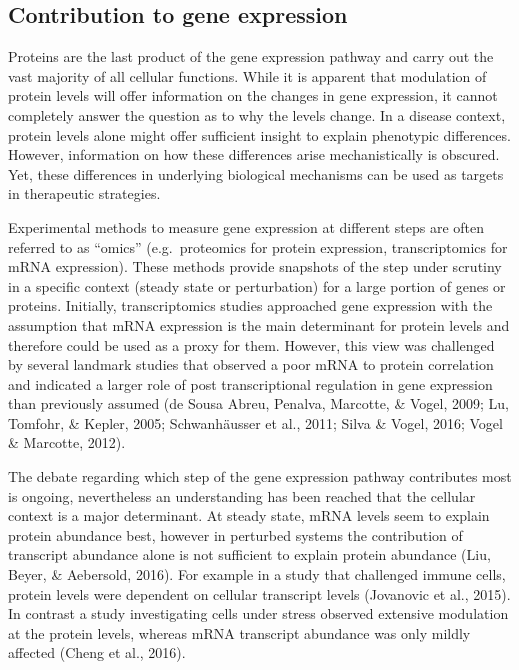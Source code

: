 \documentclass[
  12pt,
  openany]{book}
\begin{document}
\subsection{Contribution to gene expression}

Proteins are the last product of the gene expression pathway and carry out the vast majority of all cellular functions. While it is apparent that modulation of protein levels will offer information on the changes in gene expression, it cannot completely answer the question as to why the levels change. In a disease context, protein levels alone might offer sufficient insight to explain phenotypic differences. However, information on how these differences arise mechanistically is obscured. Yet, these differences in underlying biological mechanisms can be used as targets in therapeutic strategies.

Experimental methods to measure gene expression at different steps are often referred to as ``omics'' (e.g.~proteomics for protein expression, transcriptomics for mRNA expression). These methods provide snapshots of the step under scrutiny in a specific context (steady state or perturbation) for a large portion of genes or proteins. Initially, transcriptomics studies approached gene expression with the assumption that mRNA expression is the main determinant for protein levels and therefore could be used as a proxy for them. However, this view was challenged by several landmark studies that observed a poor mRNA to protein correlation and indicated a larger role of post transcriptional regulation in gene expression than previously assumed (de Sousa Abreu, Penalva, Marcotte, \& Vogel, 2009; Lu, Tomfohr, \& Kepler, 2005; Schwanhäusser et al., 2011; Silva \& Vogel, 2016; Vogel \& Marcotte, 2012).

The debate regarding which step of the gene expression pathway contributes most is ongoing, nevertheless an understanding has been reached that the cellular context is a major determinant. At steady state, mRNA levels seem to explain protein abundance best, however in perturbed systems the contribution of transcript abundance alone is not sufficient to explain protein abundance (Liu, Beyer, \& Aebersold, 2016). For example in a study that challenged immune cells, protein levels were dependent on cellular transcript levels (Jovanovic et al., 2015). In contrast a study investigating cells under stress observed extensive modulation at the protein levels, whereas mRNA transcript abundance was only mildly affected (Cheng et al., 2016).
\end{document}
